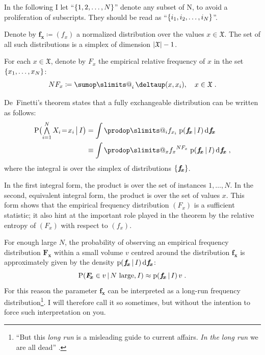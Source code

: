 \documentclass[\ifafour a4paper,12pt,\else a5paper,10pt,\fi%
onecolumn,oneside,article,%
british%
]{memoir}
\makeatletter
\theoremstyle{remark}
\theoremstyle{innote}
\def\sum{\DOTSI\sumop\slimits@}
\def\prod{\DOTSI\prodop\slimits@}
\newcommand*{\delt}{\deltaup}%
\newcommand*{\di}{\mathrm{d}}%
\newcommand*{\NN}{\bm{\mathrm{N}}}
\newcommand*{\defd}{\coloneqq}
\newcommand*{\Land}{\mathop{\textstyle\bigwedge}}
\DeclarePairedDelimiter\abs{\lvert}{\rvert}
\DeclarePairedDelimiter\set{\{}{\}}
\newcommand*{\pf}{\mathrm{p}}%
\newcommand*{\p}{\mathrm{P}}%
\renewcommand*{\|}[1][]{\nonscript\,#1\vert\nonscript\,\mathopen{}}
\newcommand*{\sect}{\S}%
\newcommand*{\tsum}{\mathop{\textstyle\sum}\nolimits}
\renewcommand*{\=}{\TextOrMath\texteq\eq}
\newcommand*{\X}[1]{X_{#1}}
\newcommand*{\x}[1]{x_{#1}}
\newcommand*{\sX}{\mathfrak{X}}
\newcommand*{\vf}{v}
\newcommand*{\fx}{\bm{f_{\!x}}}
\newcommand*{\Fx}{\bm{F_{\!x}}}
\makeatother
\begin{document}
In the following I let \enquote{$\set{1, 2, \dotsc, N}$} denote any subset
of $\NN$, to avoid a proliferation of subscripts. They should be read as
\enquote{$\set{i_{1}, i_{2}, \dotsc, i_{N}}$}.

Denote by $\fx \defd (f_{x})$ a normalized distribution over the values
$x \in \sX$. The set of all such distributions is a simplex of dimension
$\abs{\sX}-1$.

For each $x \in \sX$, denote by $F_{x}$ the empirical relative frequency of
$x$ in the set $\set{x_{1}, \dotsc, x_{N}}$:
\begin{equation}
  \label{eq:rel_frequencies}
  N F_{x} \defd \tsum_{i}\delt(x, \x{i}), \quad x \in \sX \;.
\end{equation}

De~Finetti's theorem states that a fully exchangeable distribution can be
written as follows:
\begin{equation}
  \label{eq:definetti_freq}
  \begin{split}
  \p\bigl( \Land_{i=1}^{N}\X{i}\=\x{i} \|[\big] I\bigr) &=
  \int \prod_{i} f_{\x{i}}\;  \pf(\fx \| I)\,\di\fx
\\&\equiv  \int\prod_{x} {f_{x}}^{N F_{x}}\;   \pf(\fx \| I)\,\di\fx \;,
\end{split}
\end{equation}
where the integral is over the simplex of distributions $\set{\fx}$.

In the first integral form, the product is over the set of instances
$1,\dotsc,N$. In the second, equivalent integral form, the product is over
the set of values $x$. This form shows that the empirical frequency
distribution $(F_{x})$ is a sufficient statistic; it also hint at the
important role played in the theorem by the relative entropy of $(F_{x})$
with respect to $(f_{x})$.

For enough large $N$, the probability of observing an empirical frequency
distribution $\Fx$ within a small volume $\vf$ centred around the
distribution $\fx$ is approximately given by the density
$\pf(\fx \| I)\,\di\fx$:
\begin{equation}
  \label{eq:longrun_freq}
  \p( \Fx \in v \| \text{$N$ large}, I)
  \approx \pf(\fx \| I)\,v \;.
\end{equation}
For this reason the parameter $\fx$ can be interpreted as a long-run
frequency distribution\footnote{\enquote{But this \emph{long run} is a
    misleading guide to current affairs. \emph{In the long run} we are all
    dead} \parencite[\sect~3.I p.~65]{keynes1923_r2013}.}. I will therefore call it so sometimes, but without
the intention to force such interpretation on you.
\end{document}
